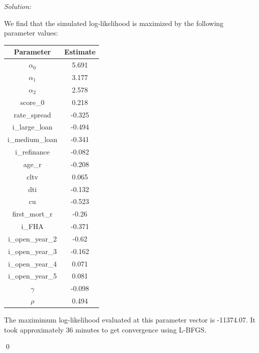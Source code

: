 \documentclass[12pt]{article}
\newenvironment{sol}
    {\emph{Solution:}
    }
    {
    \qed
    }
\begin{document}
\begin{sol}
We find that the simulated log-likelihood is maximized by the following parameter values:
\begin{table}[!htbp]
    \centering
    \begin{tabular}{|c|c|}
        \hline
        Parameter & Estimate\\
        \hline 
        $\alpha_0$ & 5.691 \\
$\alpha_1$ & 3.177 \\
$\alpha_2$ & 2.578 \\
score\_0 & 0.218 \\
rate\_spread & -0.325 \\
i\_large\_loan & -0.494 \\
i\_medium\_loan & -0.341 \\ 
i\_refinance & -0.082 \\
age_r & -0.208 \\
cltv & 0.065 \\
dti & -0.132 \\
cu & -0.523 \\
first\_mort\_r & -0.26 \\
i\_FHA & -0.371 \\
i\_open\_year\_2 &-0.62 \\
i\_open\_year\_3 &-0.162 \\
i\_open\_year\_4 &0.071 \\
i\_open\_year\_5 &0.081 \\
$\gamma$ & -0.098 \\
$\rho$ & 0.494 \\
\hline
    \end{tabular}
\end{table}
The maximimum log-likelihood evaluated at this parameter vector is -11374.07. It took approximately 36 minutes to get convergence using L-BFGS.


\end{sol}
\end{document}
